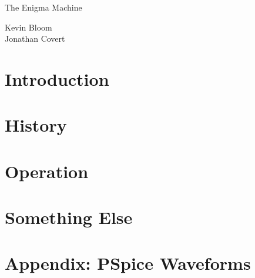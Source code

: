 \documentclass[12pt,a4paper,titlepage]{article}
\begin{document}
\pagestyle{headings}
\setcounter{page}{1}

\thispagestyle{empty}

\begin{flushleft}
\vspace*{1.5in}

{\huge The Enigma Machine}

\vspace{0.25in}

{\Large Kevin Bloom \\ Jonathan Covert}

\vspace{0.25in}

\vfill

\end{flushleft}

\newpage

\tableofcontents

\newpage

\section{Introduction}

\section{History}

\section{Operation}

\section{Something Else}

\newpage

\appendix

\section{Appendix: PSpice Waveforms}

\end{document}
